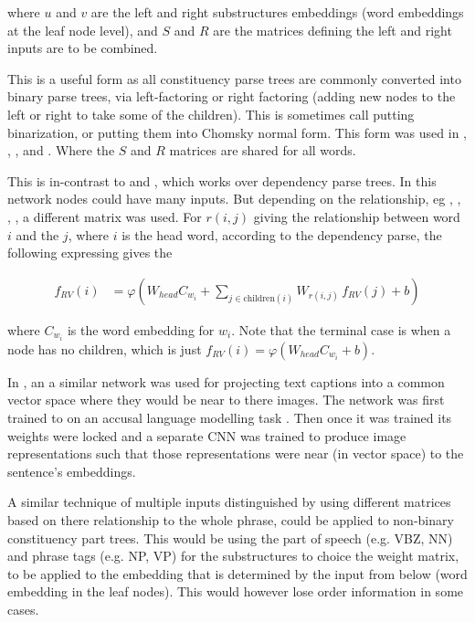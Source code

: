 \documentclass[12pt,parskip]{komatufte}
\begin{document}
where $u$ and $v$ are the left and right substructures embeddings (word embeddings at the leaf node level), and $S$ and $R$ are the matrices defining the left and right inputs are to be combined.

This is a useful form as all constituency parse trees are commonly converted into binary parse trees, via left-factoring or right factoring (adding new nodes to the left or right to take some of the children).
This is sometimes call putting binarization, or putting them into  Chomsky normal form.
This form was used in , ,  ,
  and .
Where the $S$ and $R$ matrices are shared for all words.

This is in-contrast to  and , which works over dependency parse trees.
In this network nodes could have many inputs.
But depending on the relationship, eg , , , , a different matrix was used.
For $r(i,j)$ giving the relationship between word $i$ and the $j$, where $i$ is the head word, according to the dependency parse,
the following expressing gives the 

\begin{align}
	f_{RV}(i) &= \varphi\left(W_{head} C_{w_i} + \sum_{j \in \mathrm{children}(i)} W_{r(i,j)} \, f_{RV}(j) + b \right)
\end{align}

where $C_{w_i}$ is the word embedding for $w_i$.
Note that the terminal case is when a node has no children, which is just $f_{RV}(i) = \varphi \left( W_{head} C_{w_i} + b \right)$.




In \textcite{socherDTRNN}, an a similar network was used for projecting text captions into a common vector space where they would be near to there images.
The network was first trained to on an accusal language modelling task .
Then once it was trained its weights were locked and a separate CNN was trained to produce image representations such that those representations were near (in vector space) to the sentence's embeddings.


A similar technique of multiple inputs distinguished by using different matrices based on there relationship to the whole phrase,
 could be applied to non-binary constituency part trees.
This would be using the part of speech (e.g. VBZ, NN) and phrase tags (e.g. NP, VP) for the substructures to choice the weight matrix, to be applied to the embedding that is determined by the input from below (word embedding in the leaf nodes).
This would however lose order information in some cases.
\end{document}
